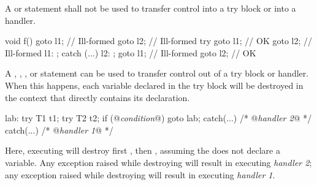 \pnum
{}%
%
%
%
%
%
A  or  statement shall not be used to transfer control
into a try block or into a handler.
\enterexample
\begin{codeblock}
void f() {
  goto l1;          // Ill-formed
  goto l2;          // Ill-formed
  try {
    goto l1;        // OK
    goto l2;        // Ill-formed
    l1: ;
  } catch (...) {
    l2: ;
    goto l1;        // Ill-formed
    goto l2;        // OK
  }
}

\end{codeblock}
\exitexample
{}%
%
%
%
%
%
%
%
A
,
,
,
or
statement can be used to transfer control out of
a try block or handler.
When this happens, each variable declared in the try block
will be destroyed in the context that
directly contains its declaration.
\enterexample

\begin{codeblock}
lab:  try {
  T1 t1;
  try {
    T2 t2;
    if (@\textit{condition}@)
      goto lab;
    } catch(...) { /* @\textit{handler 2}@ */ }
  } catch(...) { /* @\textit{handler 1}@ */ }
\end{codeblock}

Here, executing
will destroy first
,
then
,
assuming the
does not declare a variable.
Any exception raised while destroying
will result in executing
\textit{handler 2};
any exception raised while destroying
will result in executing
\textit{handler 1}.
\exitexample

